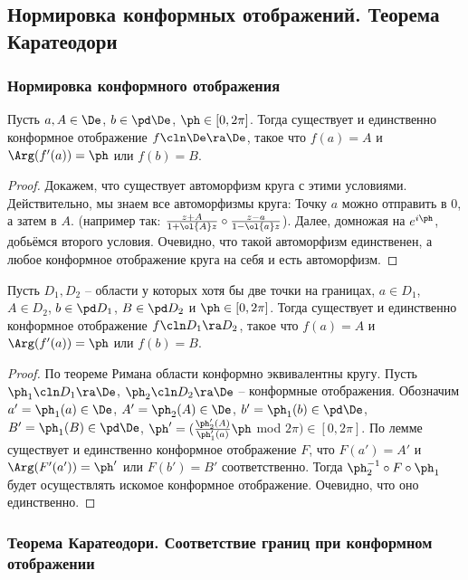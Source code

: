 \documentclass[a4paper]{article}
\begin{document}
\subsection{Нормировка конформных отображений. Теорема Каратеодори}

\subsubsection{Нормировка конформного отображения}

\begin{lemma}
Пусть $a,A\in\De$, $b\in\pd\De$, $\ph\in[0,2\pi]$.
Тогда существует и единственно конформное отображение $f\cln\De\ra\De$, такое что $f(a) = A$ и  $\Arg(f'(a))=\ph$ или $f(b)=B$.
\end{lemma}
\begin{proof}
Докажем, что существует автоморфизм круга с этими условиями. Действительно, мы знаем все автоморфизмы круга:
Точку $a$ можно отправить в $0$, а затем в $A$. (например так: $\frac{z+A}{1+\ol{A}z}\circ\frac{z-a}{1-\ol{a}z}$).
Далее, домножая на $e^{i\ph}$, добьёмся второго условия. Очевидно, что такой автоморфизм единственен, а любое
конформное отображение круга на себя и есть автоморфизм.
\end{proof}

\begin{theorem}
Пусть $D_1,D_2$ -- области у которых хотя бы две точки на границах, $a\in D_1$, $A\in D_2$, $b\in\pd D_1$, $B\in\pd D_2$ и $\ph\in[0,2\pi]$. Тогда существует и единственно конформное отображение $f\cln D_1 \ra D_2$, такое что $f(a) = A$ и  $\Arg(f'(a))=\ph$ или $f(b)=B$.
\end{theorem}
\begin{proof}
По теореме Римана области конформно эквивалентны кругу. Пусть $\ph_1\cln D_1 \ra \De$, $\ph_2\cln D_2 \ra \De$ -- конформные отображения. Обозначим $a'=\ph_1(a)\in \De$, $A'=\ph_2(A)\in \De$, $b'=\ph_1(b)\in\pd \De$, $B'=\ph_1(B)\in\pd \De$, $\ph'=(\frac{\ph'_2(A)}{\ph'_1(a)}\ph$ mod $2\pi) \in[0,2\pi]$. По лемме существует и единственно конформное отображение $F$, что $F(a') = A'$ и  $\Arg(F'(a'))=\ph'$ или $F(b')=B'$ соответственно. Тогда $\ph_2^{-1}\circ F\circ \ph_1$ будет осуществлять искомое конформное отображение. Очевидно, что оно единственно.
\end{proof}


\subsubsection{Теорема Каратеодори. Соответствие границ при конформном отображении}
\end{document}
